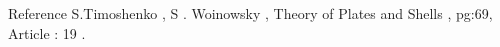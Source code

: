 \documentclass[9pt]{beamer}
\begin{document}
\begin{frame}
\begin{columns}
\end{columns}



\begin{block}{Reference}
S.Timoshenko , S . Woinowsky , Theory of Plates and Shells , pg:69, Article : 19 . 
\end{block}

\end{frame}
\end{document}
